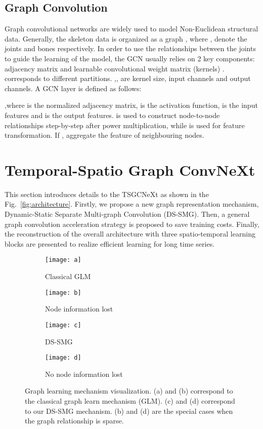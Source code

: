 \documentclass[10pt,twocolumn,letterpaper]{article}
\begin{document}
\subsection{Graph Convolution}
\label{ssec:graphconv}
Graph convolutional networks are widely used to model Non-Euclidean structural data. Generally, the skeleton data is organized as a graph , where ,  denote the joints and bones respectively. In order to use the relationships between the joints to guide the learning of the model, the GCN usually relies on 2 key components: adjacency matrix  and learnable convolutional weight matrix (kernels) .  corresponds to different partitions. ,, are kernel size, input channels and output channels. A GCN layer is defined as follows:

,where  is the normalized adjacency matrix,  is the activation function,  is the input features and  is the output features.  is used to construct node-to-node relationships step-by-step after power multiplication, while  is used for feature transformation. If ,  aggregate the feature of neighbouring nodes.

\section{Temporal-Spatio Graph ConvNeXt}
This section introduces details to the TSGCNeXt as shown in the Fig.~\ref{fig:architecture}.
Firstly, we propose a new graph representation mechanism, Dynamic-Static Separate Multi-graph Convolution (DS-SMG).
Then, a general graph convolution acceleration strategy is proposed to save training costs.
Finally, the reconstruction of the overall architecture with three spatio-temporal learning blocks are presented to realize efficient learning for long time series.


\begin{figure*}\centering
    \begin{subfigure}[b]{0.22\textwidth}
         \centering
         \texttt{[image: a]}
         \caption{Classical GLM}
         \label{(a)}
    \end{subfigure}
    \begin{subfigure}[b]{0.22\textwidth}
         \centering
         \texttt{[image: b]}
         \caption{Node information lost}
         \label{(b)}
    \end{subfigure}
    \begin{subfigure}[b]{0.22\textwidth}
         \centering
         \texttt{[image: c]}
         \caption{DS-SMG}
         \label{(c)}
    \end{subfigure}
    \begin{subfigure}[b]{0.22\textwidth}
         \centering
         \texttt{[image: d]}
         \caption{No node information lost}
         \label{(d)}
    \end{subfigure}
    \caption{Graph learning mechanism visualization. (a) and (b) correspond to the classical graph learn mechanism (GLM). (c) and (d) correspond to our DS-SMG mechanism. (b) and (d) are the special cases when the graph relationship is sparse.} \label{fig:complexity}
    \vspace{-1em}
\end{figure*}
\end{document}

